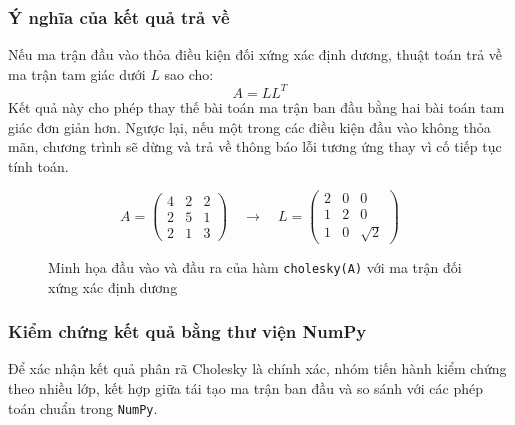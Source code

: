 \documentclass[12pt,a4paper]{article}
\begin{document}
\subsubsection{Ý nghĩa của kết quả trả về}

\begin{infobox}
Nếu ma trận đầu vào thỏa điều kiện đối xứng xác định dương, thuật toán trả về ma trận tam giác dưới $L$ sao cho:
\begin{equation}
A = LL^T
\end{equation}
Kết quả này cho phép thay thế bài toán ma trận ban đầu bằng hai bài toán tam giác đơn giản hơn. Ngược lại, nếu một trong các điều kiện đầu vào không thỏa mãn, chương trình sẽ dừng và trả về thông báo lỗi tương ứng thay vì cố tiếp tục tính toán.
\end{infobox}


\begin{figure}[H]
\centering

\[
A =
\begin{pmatrix}
4 & 2 & 2 \\
2 & 5 & 1 \\
2 & 1 & 3
\end{pmatrix}
\quad \longrightarrow \quad
L =
\begin{pmatrix}
2 & 0 & 0 \\
1 & 2 & 0 \\
1 & 0 & \sqrt{2}
\end{pmatrix}
\]

\caption{Minh họa đầu vào và đầu ra của hàm \texttt{cholesky(A)} với ma trận đối xứng xác định dương}
\end{figure}

\subsubsection{Kiểm chứng kết quả bằng thư viện NumPy}

Để xác nhận kết quả phân rã Cholesky là chính xác, nhóm tiến hành kiểm chứng theo nhiều lớp, kết hợp giữa tái tạo ma trận ban đầu và so sánh với các phép toán chuẩn trong \texttt{NumPy}.
\end{document}
